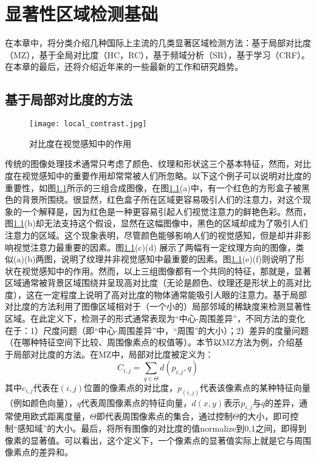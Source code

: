 
\chapter{显著性区域检测基础}
在本章中，将分类介绍几种国际上主流的几类显著区域检测方法：基于局部对比度（MZ\cite{ma2003contrast}），基于全局对比度（HC，RC\cite{cheng2011global}），基于频域分析（SR\cite{hou2007saliency}），基于学习（CRF\cite{maisaliency}）。在本章的最后，还将介绍近年来的一些最新的工作和研究趋势。

\section{基于局部对比度的方法}
\begin{figure}[h]
\centering
\texttt{[image: local\_contrast.jpg]}
\caption{对比度在视觉感知中的作用}\label{fig:local_contrast}
\end{figure}
传统的图像处理技术通常只考虑了颜色、纹理和形状这三个基本特征，然而，对比度在视觉感知中的重要作用却常常被人们所忽略。以下这个例子可以说明对比度的重要性\citep{ma2003contrast}，如图\ref{fig:local_contrast}所示的三组合成图像，在图\ref{fig:local_contrast}(a)中，有一个红色的方形盒子被黑色的背景所围绕。很显然，红色盒子所在区域更容易吸引人们的注意力，对这个现象的一个解释是，因为红色是一种更容易引起人们视觉注意力的鲜艳色彩。然而，图\ref{fig:local_contrast}(b)却无法支持这个假设，显然在这幅图像中，黑色的区域却成为了吸引人们注意力的区域。这个现象表明，尽管颜色能够影响人们的视觉感知，但是却并非影响视觉注意力最重要的因素。图\ref{fig:local_contrast}(c)(d) 展示了两幅有一定纹理方向的图像，类似(a)(b)两图，说明了纹理并非视觉感知中最重要的因素。图\ref{fig:local_contrast}(e)(f)则说明了形状在视觉感知中的作用。然而，以上三组图像都有一个共同的特征，那就是，显著区域通常被背景区域围绕并呈现高对比度（无论是颜色、纹理还是形状上的高对比度），这在一定程度上说明了高对比度的物体通常能吸引人眼的注意力。基于局部对比度的方法利用了图像区域相对于（一个小的）局部邻域的稀缺度来检测显著性区域。在此定义下，检测子的形式通常表现为“中心-周围差异”，不同方法的变化在于：1）尺度问题（即“中心-周围差异”中，“周围”的大小）；2）差异的度量问题（在哪种特征空间下比较、周围像素点的权值等）。本节以MZ\cite{ma2003contrast}方法为例，介绍基于局部对比度的方法。在MZ中，局部对比度被定义为：
\begin{equation}
C_{i,j} = \sum_{q \in \Theta}d(p_{i,j},q) \label{eq:local}
\end{equation}
其中$c_{i,j}$代表在$(i,j)$位置的像素点的对比度，$p_(i,j)$代表该像素点的某种特征向量（例如颜色向量），$q$代表周围像素点的特征向量，$d(x,y)$表示$p_{i,j}$与$q$的差异，通常使用欧式距离度量，$\Theta$即代表周围像素点的集合，通过控制$\Theta$的大小，即可控制“感知域”的大小。最后，将所有图像的对比度的值normalize到0,1之间，即得到像素的显著值。可以看出，这个定义下，一个像素点的显著值实际上就是它与周围像素点的差异和。

